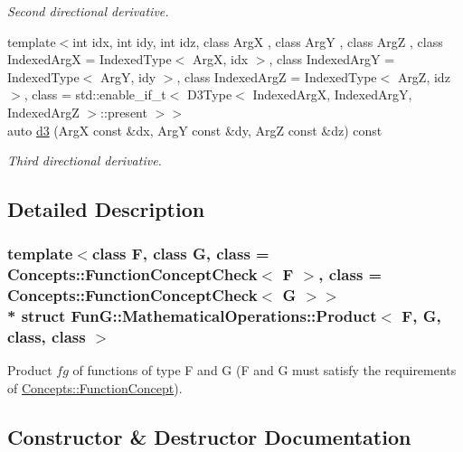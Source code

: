 \begin{DoxyCompactItemize}
\begin{DoxyCompactList}\small\item\em Second directional derivative. \end{DoxyCompactList}\item 
{\footnotesize template$<$int idx, int idy, int idz, class ArgX , class ArgY , class ArgZ , class Indexed\+ArgX  = Indexed\+Type$<$ Arg\+X, idx $>$, class Indexed\+ArgY  = Indexed\+Type$<$ Arg\+Y, idy $>$, class Indexed\+ArgZ  = Indexed\+Type$<$ Arg\+Z, idz $>$, class  = std\+::enable\+\_\+if\+\_\+t$<$                           D3\+Type$<$ Indexed\+Arg\+X, Indexed\+Arg\+Y, Indexed\+Arg\+Z $>$\+::present $>$$>$ }\\auto \hyperlink{structFunG_1_1MathematicalOperations_1_1Product_a1ba58e174ea3864a63a4158b95fc8db0}{d3} (ArgX const \&dx, ArgY const \&dy, ArgZ const \&dz) const 
\begin{DoxyCompactList}\small\item\em Third directional derivative. \end{DoxyCompactList}\end{DoxyCompactItemize}


\subsection{Detailed Description}
\subsubsection*{template$<$class F, class G, class = Concepts\+::\+Function\+Concept\+Check$<$ F $>$, class = Concepts\+::\+Function\+Concept\+Check$<$ G $>$$>$\\*
struct Fun\+G\+::\+Mathematical\+Operations\+::\+Product$<$ F, G, class, class $>$}

Product $fg$ of functions of type F and G (F and G must satisfy the requirements of \hyperlink{structFunG_1_1Concepts_1_1FunctionConcept}{Concepts\+::\+Function\+Concept}). 

\subsection{Constructor \& Destructor Documentation}
